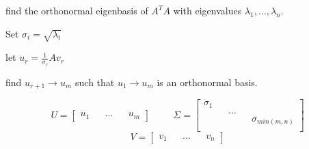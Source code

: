 \documentclass[fleqn]{report}
\newcommand{\hp}{\hspace{1cm}}
\begin{document}
find the orthonormal eigenbasis of $A^T A$ with eigenvalues 
$\lambda_1, \ldots, \lambda_n$. 

Set $\sigma_i = \sqrt{\lambda_i}$ 

let $u_r = \frac{1}{\sigma_r} A v_r$

find $u_{r+1} \to u_m$ such that $u_1 \to u_m$ is an orthonormal basis. 

\[
U = 
\begin{bmatrix}
    u_1 && \ldots && u_m
\end{bmatrix}
\hp 
\Sigma = 
\begin{bmatrix}
    \sigma_1 && && \\
    && \ldots && \\
    && && \sigma_{min(m, n)} \\
\end{bmatrix}
\]
\[
V = 
\begin{bmatrix}
    v_1 && \ldots && v_n
\end{bmatrix}
\]
\end{document}
